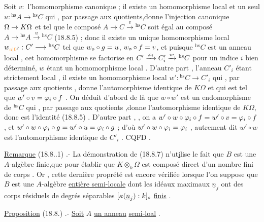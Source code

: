 Soit $v:$   l'homomorphisme canonique ; il existe  un homomorphisme
local et un seul $u:{}^{\mathrm{hs}}A\to{}^{\mathrm{hs}}C$ qui , par passage aux quotients,donne l'injection
canonique $\Omega\to K\Omega$  et tel que le composé $A\longrightarrow C\xrightarrow{v}{}^{\mathrm{hs}}C$
soit égal au composé $A\longrightarrow{}^{\mathrm{hs}}A\xrightarrow{u}{}^{\mathrm{hs}}C$ (18.8.5) ; donc il existe un unique
homomorphisme local $w_{\unsure{o|0}}:C'\longrightarrow{}^{\mathrm{hs}}C$ tel que $w_o\circ g=u$, $w_o\circ f=v$, et puisque $ {}^{\mathrm{hs}}C$
est un anneau local , cet homomorphisme se factorise en $C'\xrightarrow{\varphi_i}C'_i\xrightarrow{w}{}^{\mathrm{hs}}C$
pour un indice $i$ bien déterminé, $w$ étant un homomorphisme local . D'autre
part , l'anneau $C'_i$ étant strictement local , il existe un homomorphisme local
$w':{}^{\mathrm{hs}}C\to C'_i$ qui , par passage aux quotients , donne l'automorphisme
identique de $K\Omega$ et qui est tel que $w'\circ v=\varphi_i\circ f$  . On déduit d'abord de là
que $w\circ w'$ est un endomorphisme de $ {}^{\mathrm{hs}}C$ qui , par passage aux quotients ,donne
l'automorphisme identique de $K\Omega$, donc est l'identité (18.8.5) . D'autre
part , , on a $w'\circ w\circ\varphi_i\circ f=w'\circ v=\varphi_i\circ f$ , et $w'\circ w\circ\varphi_i\circ g=w'\circ u=\varphi_i\circ g$ ; d'où $w'\circ w\circ\varphi_i=
\varphi_i$ , autrement dit $w'\circ w$ est l'automorphisme identique de $C'_i$ . CQFD .

\uline{Remarque} (18.8.{}.1) .- La démonstration de (18.8.7)
\handwritten{\unsure{!}} n'ut\uline{i}lise le
fait que $B$ est une $A$-algèbre finie,que pour établir que $K\otimes_k\Omega$ est
composé direct d'un nombre fini de corps . Or , cette dernière proprété
est encore vérifiée lorsque l'on suppose que $B$ est une $A$-algèbre
\uline{entière semi-locale} dont les idéaux maximaux $\underline{n}_j$ ont des corps résiduels
de degrés séparables $[\kappa(\underline{n}_j):k]_s$ \uline{finis} .

\uline{Proposition} (18.8.) .- \uline{Soit} $A$ \uline{un anneau}  \uline{semi-loal} .

